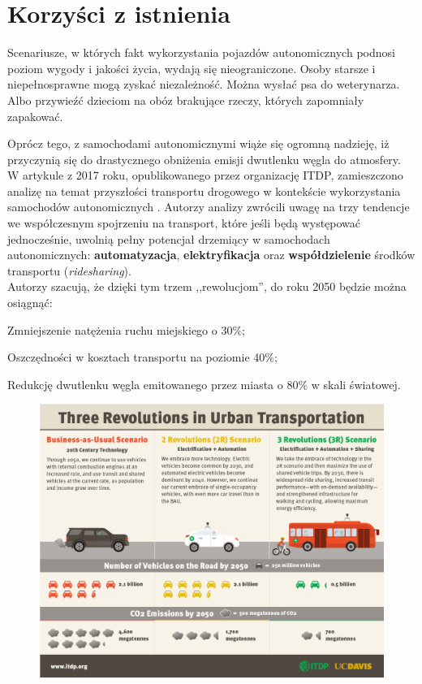 \section{Korzyści z istnienia}
Scenariusze, w których fakt wykorzystania pojazdów autonomicznych podnosi poziom wygody i jakości życia, wydają się nieograniczone. Osoby starsze i niepełnosprawne mogą zyskać niezależność. Można wysłać psa do weterynarza. Albo przywieźć dzieciom na obóz brakujące rzeczy, których zapomniały zapakować.

Oprócz tego, z samochodami autonomicznymi wiąże się ogromną nadzieję, iż przyczynią się do drastycznego obniżenia emisji dwutlenku węgla do atmosfery. W artykule z 2017 roku, opublikowanego przez organizację ITDP, zamieszczono analizę na temat przyszłości transportu drogowego w kontekście wykorzystania samochodów autonomicznych \cite{itdp:urbanTransportRevolutions}. Autorzy analizy zwrócili uwagę na trzy tendencje we współczesnym spojrzeniu na transport, które jeśli będą występować jednocześnie, uwolnią pełny potencjał drzemiący w samochodach autonomicznych: \textbf{automatyzacja}, \textbf{elektryfikacja} oraz \textbf{współdzielenie} środków transportu (\textit{ridesharing}). \\
Autorzy szacują, że dzięki tym trzem ,,rewolucjom'', do roku 2050 będzie można osiągnąć:
\begin{enumerate*}
\item Zmniejszenie natężenia ruchu miejskiego o 30\%;
\item Oszczędności w kosztach transportu na poziomie 40\%;
\item Redukcję dwutlenku węgla emitowanego przez miasta o 80\% w skali światowej.
\end{enumerate*}

\begin{figure}[H]
\centering
\includegraphics[width=15cm]{resources/figures/itdp_infographic.jpg}
\end{figure}

